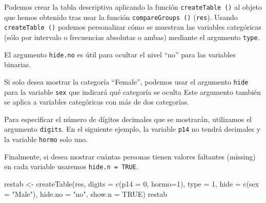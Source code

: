 \documentclass[
]{book}
\newenvironment{Shaded}{\begin{snugshade}}{\end{snugshade}}
\newcommand{\AttributeTok}[1]{\textcolor[rgb]{0.77,0.63,0.00}{#1}}
\newcommand{\ConstantTok}[1]{\textcolor[rgb]{0.00,0.00,0.00}{#1}}
\newcommand{\DecValTok}[1]{\textcolor[rgb]{0.00,0.00,0.81}{#1}}
\newcommand{\FunctionTok}[1]{\textcolor[rgb]{0.00,0.00,0.00}{#1}}
\newcommand{\NormalTok}[1]{#1}
\newcommand{\OtherTok}[1]{\textcolor[rgb]{0.56,0.35,0.01}{#1}}
\newcommand{\StringTok}[1]{\textcolor[rgb]{0.31,0.60,0.02}{#1}}
\begin{document}
Podemos crear la tabla descriptiva aplicando la función \texttt{createTable\ ()} al objeto que hemos obtenido tras usar la función \texttt{compareGroups\ ()} (\texttt{res}). Usando \texttt{createTable\ ()} podemos personalizar cómo se muestran las variables categóricas (sólo por intervalo o frecuencias absolutas o ambas) mediante el argumento \texttt{type}.

El argumento \texttt{hide.no} es útil para ocultar el nivel ``no'' para las variables binarias.

Si solo desea mostrar la categoría ``Female'', podemos usar el argumento \texttt{hide} para la variable \texttt{sex} que indicará qué categoría se oculta Este argumento también se aplica a variables categóricas con más de dos categorías.

Para especificar el número de dígitos decimales que se mostrarán, utilizamos el argumento \texttt{digits}. En el siguiente ejemplo, la variable \texttt{p14} no tendrá decimales y la variable \texttt{hormo} solo uno.

Finalmente, si desea mostrar cuántas personas tienen valores faltantes (missing) en cada variable usaremos \texttt{hide.n\ =\ TRUE}.

\begin{Shaded}
\begin{Highlighting}[]
\NormalTok{restab }\OtherTok{\textless{}{-}} \FunctionTok{createTable}\NormalTok{(res, }\AttributeTok{digits =} \FunctionTok{c}\NormalTok{(}\AttributeTok{p14 =} \DecValTok{0}\NormalTok{, }\AttributeTok{hormo=}\DecValTok{1}\NormalTok{), }\AttributeTok{type =} \DecValTok{1}\NormalTok{, }
                      \AttributeTok{hide =} \FunctionTok{c}\NormalTok{(}\AttributeTok{sex =} \StringTok{"Male"}\NormalTok{), }\AttributeTok{hide.no =} \StringTok{"no"}\NormalTok{, }\AttributeTok{show.n =} \ConstantTok{TRUE}\NormalTok{)}
\NormalTok{restab}
\end{Highlighting}
\end{Shaded}
\end{document}
